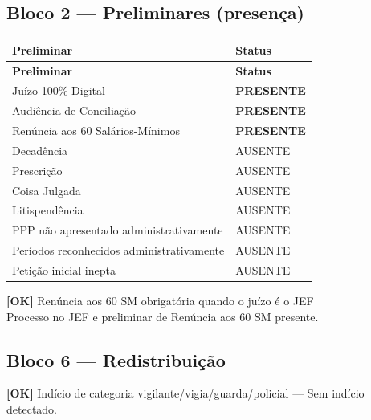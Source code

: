 \documentclass[12pt,a4paper]{article}
\newcommand{\statusOK}[1]{\textcolor{corOK}{\textbf{[OK]}} #1}
\begin{document}
\subsection{Bloco 2 --- Preliminares (presença)}

\begin{longtable}{p{8.5cm} p{4.5cm}}
  \toprule
  \textbf{Preliminar} & \textbf{Status} \\
  \midrule
  \endfirsthead
  \toprule
  \textbf{Preliminar} & \textbf{Status} \\
  \midrule
  \endhead
  Juízo 100\% Digital                           & \textcolor{corOK}{\textbf{PRESENTE}} \\
  Audiência de Conciliação                      & \textcolor{corOK}{\textbf{PRESENTE}} \\
  Renúncia aos 60 Salários-Mínimos              & \textcolor{corOK}{\textbf{PRESENTE}} \\
  Decadência                                    & AUSENTE \\
  Prescrição                                    & AUSENTE \\
  Coisa Julgada                                 & AUSENTE \\
  Litispendência                                & AUSENTE \\
  PPP não apresentado administrativamente       & AUSENTE \\
  Períodos reconhecidos administrativamente     & AUSENTE \\
  Petição inicial inepta                        & AUSENTE \\
  \bottomrule
\end{longtable}

\statusOK{Renúncia aos 60 SM obrigatória quando o juízo é o JEF}\\
Processo no JEF e preliminar de Renúncia aos 60 SM presente.

\subsection{Bloco 6 --- Redistribuição}

\statusOK{Indício de categoria vigilante/vigia/guarda/policial} --- Sem indício detectado.
\end{document}
